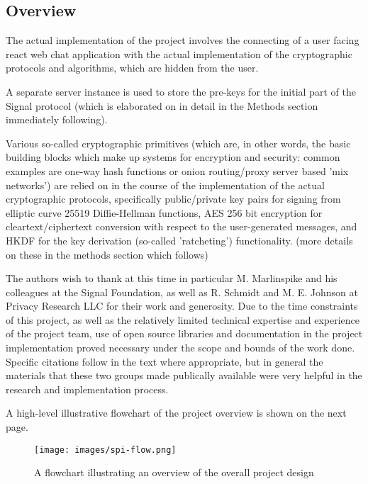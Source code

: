 \documentclass[12pt]{article}
\begin{document}
\subsection{Overview}
The actual implementation of the project involves the connecting of a user facing react web chat application with the actual implementation of the cryptographic protocols and algorithms, which are hidden from the user.
\par A separate server instance is used to store the pre-keys for the initial part of the Signal protocol (which is elaborated on in detail in the Methods section immediately following). 
\par Various so-called cryptographic primitives (which are, in other words, the basic building blocks which make up systems for encryption and security: common examples are one-way hash functions or onion routing/proxy server based 'mix networks') are relied on in the course of the implementation of the actual cryptographic protocols, specifically public/private key pairs for signing from elliptic curve 25519 Diffie-Hellman functions, AES 256 bit encryption for cleartext/ciphertext conversion with respect to the user-generated messages, and HKDF for the key derivation (so-called 'ratcheting') functionality. (more details on these in the methods section which follows)
\par The authors wish to thank at this time in particular M. Marlinspike and his colleagues at the Signal Foundation\parencite{website:sigfound}, as well as R. Schmidt and M. E. Johnson at Privacy Research LLC \parencite{website:prllc} for their work and generosity. Due to the time constraints of this project, as well as the relatively limited technical expertise and experience of the project team, use of open source libraries and documentation in the project implementation proved necessary under the scope and bounds of the work done. Specific citations follow in the text where appropriate, but in general the materials that these two groups made publically available were very helpful in the research and implementation process. \parencite{website:signal-docs}\parencite{website:prggh}\parencite{website:siglibjavascript}\parencite{website:prglibsigtypescript}\parencite{website:prglibsigdemo}
\par A high-level illustrative flowchart of the project overview is shown on the next page.

\begin{figure}[h!]
    \centering
    \texttt{[image: images/spi-flow.png]}
    \caption{A flowchart illustrating an overview of the overall project design}
    \label{fig:my_label1}
\end{figure}
\end{document}
